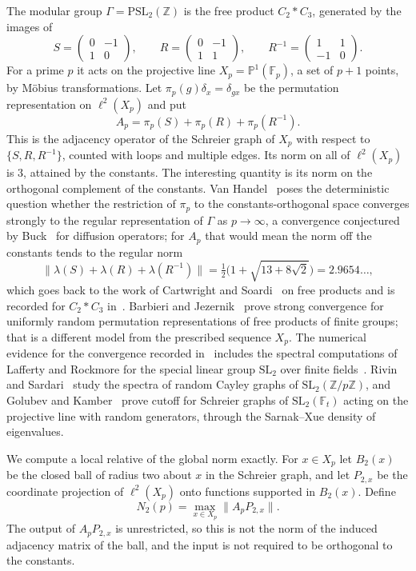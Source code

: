\documentclass[11pt,a4paper]{article}
\numberwithin{equation}{section}
\theoremstyle{remark}
\newcommand{\Z}{\mathbb Z}
\newcommand{\F}{\mathbb F}
\newcommand{\PP}{\mathbb P}
\newcommand{\PSL}{\mathrm{PSL}}
\newcommand{\SL}{\mathrm{SL}}
\begin{document}
The modular group $\Gamma=\PSL_2(\Z)$ is the free product $C_2*C_3$, generated by the images of
\[
S=\begin{pmatrix}0&-1\\1&0\end{pmatrix},\qquad R=\begin{pmatrix}0&-1\\1&1\end{pmatrix},\qquad R^{-1}=\begin{pmatrix}1&1\\-1&0\end{pmatrix}.
\]
For a prime $p$ it acts on the projective line $X_p=\PP^1(\F_p)$, a set of $p+1$ points, by M\"obius transformations. Let $\pi_p(g)\delta_x=\delta_{gx}$ be the permutation representation on $\ell^2(X_p)$ and put
\[
A_p=\pi_p(S)+\pi_p(R)+\pi_p(R^{-1}).
\]
This is the adjacency operator of the Schreier graph of $X_p$ with respect to $\{S,R,R^{-1}\}$, counted with loops and multiple edges. Its norm on all of $\ell^2(X_p)$ is $3$, attained by the constants. The interesting quantity is its norm on the orthogonal complement of the constants. Van Handel~\cite[\S6.4]{vanHandel} poses the deterministic question whether the restriction of $\pi_p$ to the constants-orthogonal space converges strongly to the regular representation of $\Gamma$ as $p\to\infty$, a convergence conjectured by Buck~\cite{Buck} for diffusion operators; for $A_p$ that would mean the norm off the constants tends to the regular norm
\[
\|\lambda(S)+\lambda(R)+\lambda(R^{-1})\|=\tfrac12\bigl(1+\sqrt{13+8\sqrt2}\bigr)=2.9654\ldots,
\]
which goes back to the work of Cartwright and Soardi~\cite{CartwrightSoardi} on free products and is recorded for $C_2*C_3$ in~\cite{BarbieriJezernik}. Barbieri and Jezernik~\cite{BarbieriJezernik} prove strong convergence for uniformly random permutation representations of free products of finite groups; that is a different model from the prescribed sequence $X_p$. The numerical evidence for the convergence recorded in~\cite[\S6.4]{vanHandel} includes the spectral computations of Lafferty and Rockmore for the special linear group $\SL_2$ over finite fields~\cite{LaffertyRockmore92,LaffertyRockmore93}. Rivin and Sardari~\cite{RivinSardari} study the spectra of random Cayley graphs of $\SL_2(\Z/p\Z)$, and Golubev and Kamber~\cite{GolubevKamber} prove cutoff for Schreier graphs of $\SL_2(\F_t)$ acting on the projective line with random generators, through the Sarnak--Xue density of eigenvalues.

We compute a local relative of the global norm exactly. For $x\in X_p$ let $B_2(x)$ be the closed ball of radius two about $x$ in the Schreier graph, and let $P_{2,x}$ be the coordinate projection of $\ell^2(X_p)$ onto functions supported in $B_2(x)$. Define
\[
N_2(p)=\max_{x\in X_p}\|A_pP_{2,x}\|.
\]
The output of $A_pP_{2,x}$ is unrestricted, so this is not the norm of the induced adjacency matrix of the ball, and the input is not required to be orthogonal to the constants.
\end{document}

